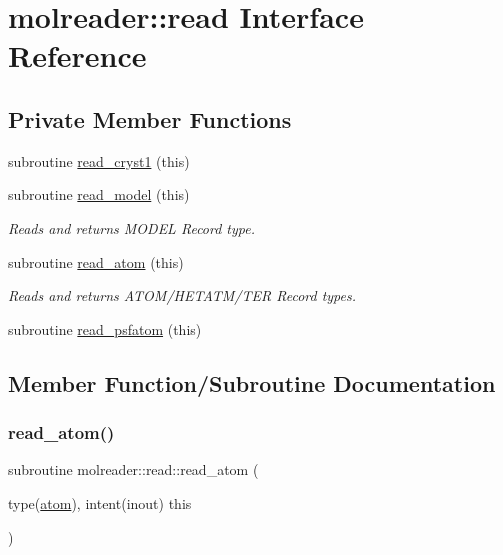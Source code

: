 \hypertarget{interfacemolreader_1_1read}{}\section{molreader\+:\+:read Interface Reference}
\label{interfacemolreader_1_1read}
\subsection*{Private Member Functions}
\begin{DoxyCompactItemize}
\item 
subroutine \hyperlink{interfacemolreader_1_1read_ace14cc5017fcc772377477cb86aebbbe}{read\+\_\+cryst1} (this)
\item 
subroutine \hyperlink{interfacemolreader_1_1read_a2548b1adf92b85ff6a09af908f1acd2a}{read\+\_\+model} (this)
\begin{DoxyCompactList}\small\item\em Reads and returns M\+O\+D\+EL Record type. \end{DoxyCompactList}\item 
subroutine \hyperlink{interfacemolreader_1_1read_a8ee447ae36f8cf0e3810fa23214e7a60}{read\+\_\+atom} (this)
\begin{DoxyCompactList}\small\item\em Reads and returns A\+T\+O\+M/\+H\+E\+T\+A\+T\+M/\+T\+ER Record types. \end{DoxyCompactList}\item 
subroutine \hyperlink{interfacemolreader_1_1read_aaf6cd04056b69eb6239580d134167c32}{read\+\_\+psfatom} (this)
\end{DoxyCompactItemize}


\subsection{Member Function/\+Subroutine Documentation}
\mbox{\label{interfacemolreader_1_1read_a8ee447ae36f8cf0e3810fa23214e7a60}} 
\subsubsection{\texorpdfstring{read\+\_\+atom()}{read\_atom()}}
{\footnotesize\ttfamily subroutine molreader\+::read\+::read\+\_\+atom (\begin{DoxyParamCaption}\item[{type(\hyperlink{structmolreader_1_1atom}{atom}), intent(inout)}]{this }\end{DoxyParamCaption})\hspace{0.3cm}{\ttfamily [private]}}



